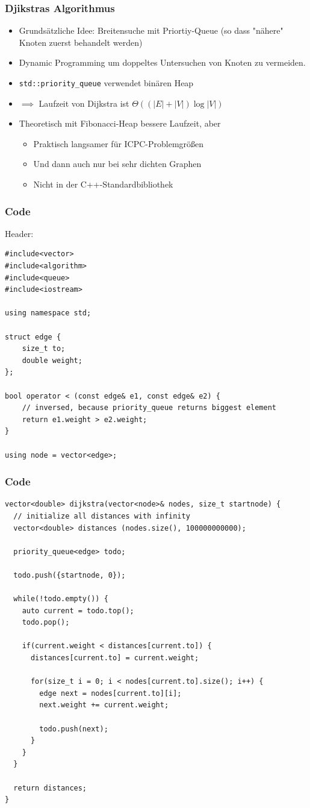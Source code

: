 \begin{frame}
\frametitle{Djikstras Algorithmus}
\begin{itemize}
\item Grundsätzliche Idee: Breitensuche mit Priortiy-Queue (so dass "nähere" Knoten zuerst behandelt werden)
\item Dynamic Programming um doppeltes Untersuchen von Knoten zu vermeiden. 
\item \lstinline|std::priority_queue| verwendet binären Heap
\item $\implies$ Laufzeit von Dijkstra ist $\Theta((|E| + |V|) \log |V|)$
\item Theoretisch mit Fibonacci-Heap bessere Laufzeit, aber \begin{itemize}
\item Praktisch langsamer für ICPC-Problemgrößen
\item Und dann auch nur bei sehr dichten Graphen
\item Nicht in der C++-Standardbibliothek
\end{itemize}
\end{itemize}
\end{frame}

\begin{frame}[fragile]
\frametitle{Code}
Header: 
\begin{lstlisting}[basicstyle=\tiny]
#include<vector>
#include<algorithm>
#include<queue> 
#include<iostream>

using namespace std;

struct edge {
    size_t to;
    double weight;
};

bool operator < (const edge& e1, const edge& e2) {
    // inversed, because priority_queue returns biggest element
    return e1.weight > e2.weight;
}

using node = vector<edge>;
\end{lstlisting}

\end{frame}

\begin{frame}[fragile]
\frametitle{Code}
\begin{lstlisting}[basicstyle=\tiny]
vector<double> dijkstra(vector<node>& nodes, size_t startnode) {
  // initialize all distances with infinity
  vector<double> distances (nodes.size(), 100000000000);

  priority_queue<edge> todo;

  todo.push({startnode, 0});
  
  while(!todo.empty()) {
    auto current = todo.top();
    todo.pop();

    if(current.weight < distances[current.to]) {
      distances[current.to] = current.weight;

      for(size_t i = 0; i < nodes[current.to].size(); i++) {
        edge next = nodes[current.to][i];
        next.weight += current.weight;

        todo.push(next);
      }
    }
  }

  return distances;
}
\end{lstlisting}

\end{frame}


